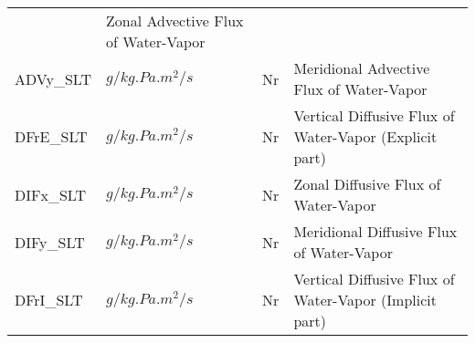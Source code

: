 \begin{table}
\begin{tabular}{llll}
         &\begin{minipage}[t]{3in}
          {Zonal      Advective Flux of Water-Vapor}
         \end{minipage}\\
 ADVy\_SLT & $g/kg.Pa.m^2/s$ & Nr 
         &\begin{minipage}[t]{3in}
          {Meridional Advective Flux of Water-Vapor}
         \end{minipage}\\
 DFrE\_SLT & $g/kg.Pa.m^2/s$ & Nr 
         &\begin{minipage}[t]{3in}
          {Vertical Diffusive Flux of Water-Vapor (Explicit part)}
         \end{minipage}\\
 DIFx\_SLT & $g/kg.Pa.m^2/s$ & Nr 
         &\begin{minipage}[t]{3in}
          {Zonal      Diffusive Flux of Water-Vapor}
         \end{minipage}\\
 DIFy\_SLT & $g/kg.Pa.m^2/s$ & Nr 
         &\begin{minipage}[t]{3in}
          {Meridional Diffusive Flux of Water-Vapor}
         \end{minipage}\\
 DFrI\_SLT & $g/kg.Pa.m^2/s$ & Nr 
         &\begin{minipage}[t]{3in}
          {Vertical Diffusive Flux of Water-Vapor (Implicit part)}
         \end{minipage}\\
\end{tabular}
\end{table}
\vspace{1.5in}
\vfill

